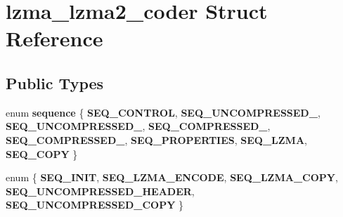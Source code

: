 \section{lzma\+\_\+lzma2\+\_\+coder Struct Reference}
\label{structlzma__lzma2__coder}
\subsection*{Public Types}
\begin{DoxyCompactItemize}
\item 
\mbox{\label{structlzma__lzma2__coder_a5783031fb721760d9f0dfdfebee3a267}} 
enum {\bfseries sequence} \{ \newline
{\bfseries S\+E\+Q\+\_\+\+C\+O\+N\+T\+R\+OL}, 
{\bfseries S\+E\+Q\+\_\+\+U\+N\+C\+O\+M\+P\+R\+E\+S\+S\+E\+D\+\_}, 
{\bfseries S\+E\+Q\+\_\+\+U\+N\+C\+O\+M\+P\+R\+E\+S\+S\+E\+D\+\_}, 
{\bfseries S\+E\+Q\+\_\+\+C\+O\+M\+P\+R\+E\+S\+S\+E\+D\+\_}, 
\newline
{\bfseries S\+E\+Q\+\_\+\+C\+O\+M\+P\+R\+E\+S\+S\+E\+D\+\_}, 
{\bfseries S\+E\+Q\+\_\+\+P\+R\+O\+P\+E\+R\+T\+I\+ES}, 
{\bfseries S\+E\+Q\+\_\+\+L\+Z\+MA}, 
{\bfseries S\+E\+Q\+\_\+\+C\+O\+PY}
 \}
\item 
\mbox{\label{structlzma__lzma2__coder_a420da3c06b5e399601172156aa1c679b}} 
enum \{ \newline
{\bfseries S\+E\+Q\+\_\+\+I\+N\+IT}, 
{\bfseries S\+E\+Q\+\_\+\+L\+Z\+M\+A\+\_\+\+E\+N\+C\+O\+DE}, 
{\bfseries S\+E\+Q\+\_\+\+L\+Z\+M\+A\+\_\+\+C\+O\+PY}, 
{\bfseries S\+E\+Q\+\_\+\+U\+N\+C\+O\+M\+P\+R\+E\+S\+S\+E\+D\+\_\+\+H\+E\+A\+D\+ER}, 
\newline
{\bfseries S\+E\+Q\+\_\+\+U\+N\+C\+O\+M\+P\+R\+E\+S\+S\+E\+D\+\_\+\+C\+O\+PY}
 \}
\end{DoxyCompactItemize}
